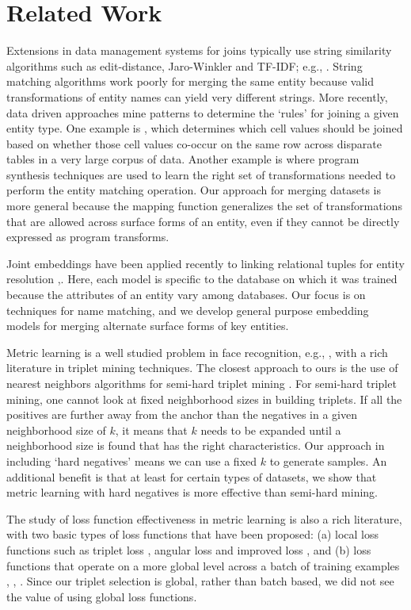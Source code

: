 \section{Related Work}
Extensions in data management systems for joins typically use string similarity algorithms such as edit-distance, Jaro-Winkler and TF-IDF; e.g., \cite{Cohen2003}.  String matching algorithms work poorly for merging the same entity because valid transformations of entity names can yield very different strings.  More recently, data driven approaches mine patterns to determine the `rules' for joining a given entity type.  One example is \cite{He:2015:SJS:2824032.2824036}, which determines which cell values should be joined based on whether those cell values co-occur on the same row across disparate tables in a very large corpus of data.  Another example is \cite{auto-join-joining-tables-leveraging-transformations} where program synthesis techniques are used to learn the right set of transformations needed to perform the entity matching operation.  Our approach for merging datasets is more general because the mapping function generalizes the set of transformations that are allowed across surface forms of an entity, even if they cannot be directly expressed as program transforms.

Joint embeddings have been applied recently to linking relational tuples for entity resolution \cite{Mudgal},\cite{Bordawekar18}.  Here, each model is specific to the database on which it was trained because the attributes of an entity vary among databases.  Our focus is on techniques for name matching, and we develop general purpose embedding models for merging alternate surface forms of key entities.  

Metric learning is a well studied problem in face recognition, e.g., \cite{DBLP:conf/cvpr/SchroffKP15}, with a rich literature in triplet mining techniques.  The closest approach to ours is the use of nearest neighbors algorithms for semi-hard triplet mining \cite{DBLP:journals/corr/KumarHC0D17}.  For semi-hard triplet mining, one cannot look at fixed neighborhood sizes in building triplets.  If all the positives are further away from the anchor than the negatives in a given neighborhood size of $k$, it means that $k$ needs to be expanded until a neighborhood size is found that has the right characteristics.  Our approach in including `hard negatives' means we can use a fixed $k$ to generate samples.  An additional benefit is that at least for certain types of datasets, we show that metric learning with hard negatives is more effective than semi-hard mining.

The study of loss function effectiveness in metric learning is also a rich literature, with two basic types of loss functions that have been proposed: (a) local loss functions such as triplet loss \cite{DBLP:conf/cvpr/SchroffKP15}, angular loss \cite{Zhang:2016:DML:3088616.3088665} and improved loss \cite{DBLP:journals/corr/abs-1708-01682}, and (b) loss functions that operate on a more global level across a batch of training examples \cite{NIPS2016_6200}, \cite{DBLP:conf/cvpr/SongXJS16}, \cite{songCVPR17}.   Since our triplet selection is global, rather than batch based, we did not see the value of using global loss functions.

